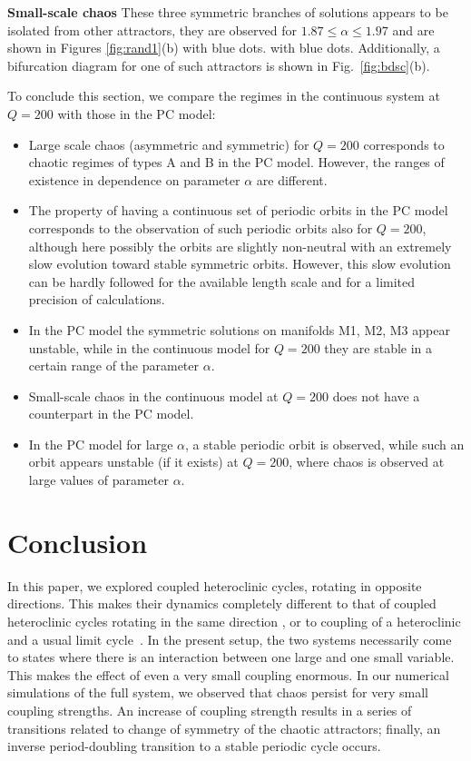\documentclass[3p,number,review,sort&compress]{elsarticle}
\begin{document}
\textbf{Small-scale chaos} 
These three symmetric branches of solutions appears to be isolated from other
attractors, they are  observed for $1.87 \leq \alpha\leq 1.97$ and are shown in Figures \ref{fig:rand1}(b) with blue dots.  
with blue dots. Additionally, a bifurcation diagram for one of such attractors is shown in Fig.~\ref{fig:bdsc}(b).

To conclude this section, we compare the regimes in the continuous system at $Q=200$ with those in the PC model:
\begin{itemize}
\item Large scale chaos (asymmetric and symmetric) for $Q=200$ corresponds 
to chaotic  regimes of types A and B in the PC model. However, the ranges of  existence in dependence on parameter $\alpha$ are different. 
\item The property of having a continuous set of periodic orbits in the PC model corresponds to the observation of 
such periodic orbits also for $Q=200$, although here possibly the orbits are slightly non-neutral with an
extremely slow evolution toward stable symmetric orbits.
However, this slow evolution
can be hardly followed for the available length scale and for a limited precision of calculations.
\item In the PC model the symmetric solutions on manifolds M1, M2, M3 appear unstable,
while in the continuous model for $Q=200$ they are stable
in a certain range of the parameter $\alpha$.
\item Small-scale chaos in the continuous model 
at $Q=200$ does not have a counterpart in the PC model.
\item In the PC model for large $\alpha$, a stable periodic orbit is observed, while such an orbit 
appears unstable (if it exists) at $Q=200$, where chaos is observed at large values of parameter $\alpha$.
\end{itemize}





\section{Conclusion}
\label{sec:concl}

In this paper, we explored  coupled heteroclinic cycles, rotating in opposite directions. This makes their dynamics completely different to that of coupled heteroclinic cycles rotating in the same direction \cite{PhysRevE.85.016215},
or to coupling of a heteroclinic and a usual limit cycle~\cite{TACHIKAWA2007374}. In the present setup, the two systems necessarily come to states where there is  an interaction between one large and one small variable. This makes the effect of even a very small coupling enormous. In our numerical simulations of the full system, we observed that chaos persist for very small coupling strengths.  An increase 
of coupling strength results in a series of transitions related to change of symmetry of the chaotic attractors; finally, an inverse period-doubling transition to a stable periodic cycle occurs. 
\end{document}

